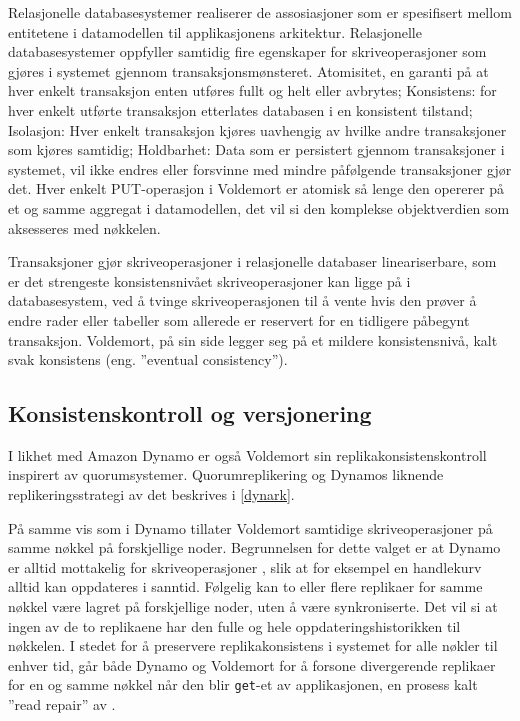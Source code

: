 Relasjonelle databasesystemer realiserer de assosiasjoner som er spesifisert mellom entitetene i datamodellen til applikasjonens arkitektur. Relasjonelle databasesystemer oppfyller samtidig fire egenskaper for skriveoperasjoner som gjøres i systemet gjennom transaksjonsmønsteret. Atomisitet, en garanti på at hver enkelt transaksjon enten utføres fullt og helt eller avbrytes; Konsistens: for hver enkelt utførte transaksjon etterlates databasen i en konsistent tilstand; Isolasjon: Hver enkelt transaksjon kjøres uavhengig av hvilke andre transaksjoner som kjøres samtidig; Holdbarhet: Data som er persistert gjennom transaksjoner i systemet, vil ikke endres eller forsvinne med mindre påfølgende transaksjoner gjør det. Hver enkelt PUT-operasjon i Voldemort er atomisk så lenge den opererer på et og samme aggregat i datamodellen, det vil si den komplekse objektverdien som aksesseres med nøkkelen.

Transaksjoner gjør skriveoperasjoner i relasjonelle databaser lineariserbare, som er det strengeste konsistensnivået skriveoperasjoner kan ligge på i databasesystem, ved å tvinge skriveoperasjonen til å vente hvis den prøver å endre rader eller tabeller som allerede er reservert for en tidligere påbegynt transaksjon. Voldemort, på sin side legger seg på et mildere konsistensnivå, kalt svak konsistens (eng. ''eventual consistency'').

\subsection{Konsistenskontroll og versjonering}
I likhet med Amazon Dynamo er også Voldemort sin replikakonsistenskontroll inspirert av quorumsystemer. Quorumreplikering og Dynamos liknende replikeringsstrategi av det beskrives i \ref{dynark}.

På samme vis som i Dynamo tillater Voldemort samtidige skriveoperasjoner på samme nøkkel på forskjellige noder. Begrunnelsen for dette valget er at Dynamo er alltid mottakelig for skriveoperasjoner \citep{decandia2007}, slik at for eksempel en handlekurv alltid kan oppdateres i sanntid. Følgelig kan to eller flere replikaer for samme nøkkel være lagret på forskjellige noder, uten å være synkroniserte. Det vil si at ingen av de to replikaene har den fulle og hele oppdateringshistorikken til nøkkelen. I stedet for å preservere replikakonsistens i systemet for alle nøkler til enhver tid, går både Dynamo og Voldemort for å forsone divergerende replikaer for en og samme nøkkel når den blir \texttt{get}-et av applikasjonen, en prosess kalt ''read repair'' av \cite{decandia2007}.

